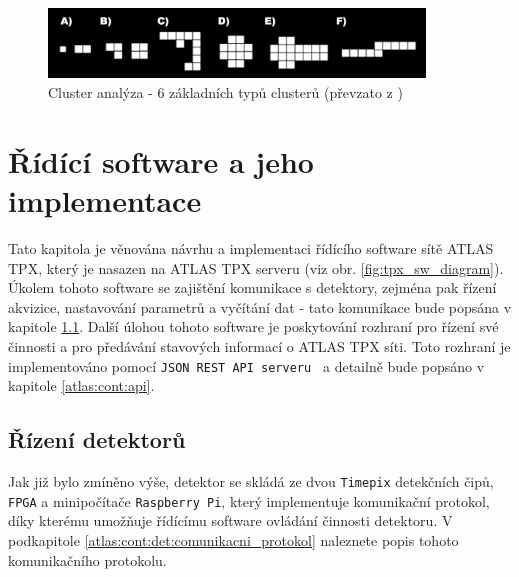 \begin{figure}[t]
	\begin{center}
		\includegraphics[width=10cm]{figures/ca.png}
		\caption{Cluster analýza - 6 základních typů clusterů (převzato z \cite{TurecekThesis2011})}
		\label{fig:tpx_ca}
	\end{center}
\end{figure}


\section{Řídící software a jeho implementace}\label{atlas:cont}
Tato kapitola je věnována návrhu a implementaci řídícího software sítě ATLAS TPX, který je nasazen na ATLAS TPX serveru (viz obr. \ref{fig:tpx_sw_diagram}). Úkolem  tohoto software se zajištění komunikace s detektory, zejména pak řízení akvizice, nastavování parametrů a vyčítání dat - tato komunikace bude popsána v kapitole \ref{atlas:cont:det}. Další úlohou tohoto software je poskytování rozhraní pro řízení své činnosti a pro předávání stavových informací o ATLAS TPX síti. Toto rozhraní je implementováno pomocí \texttt{JSON REST API serveru } a detailně bude popsáno v kapitole \ref{atlas:cont:api}.

\subsection{Řízení detektorů}\label{atlas:cont:det} %
Jak již bylo zmíněno výše, detektor se skládá ze dvou \texttt{Timepix} detekčních čipů, \texttt{FPGA} a minipočítače \texttt{Raspberry Pi}, který implementuje komunikační protokol, díky kterému umožňuje řídícímu software ovládání činnosti detektoru. V podkapitole \ref{atlas:cont:det:comunikacni_protokol} naleznete popis tohoto komunikačního protokolu.

